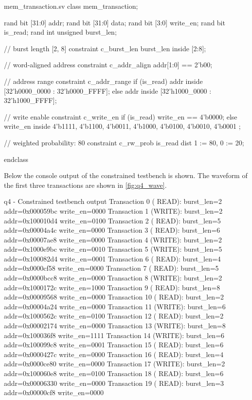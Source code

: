 \documentclass[../main.tex]{subfiles}
\begin{document}
\begin{svcode}{mem\_transaction.sv}
class mem_transaction;

  rand bit [31:0]   addr;
  rand bit [31:0]   data;
  rand bit [3:0]    write_en;
  rand bit          is_read;
  rand int unsigned burst_len;

  // burst length [2, 8]
  constraint c_burst_len {
    burst_len inside {[2:8]};
  }

  // word-aligned address
  constraint c_addr_align {
    addr[1:0] == 2'b00;
  }

  // address range
  constraint c_addr_range {
    if (is_read)
      addr inside {[32'h0000_0000 : 32'h0000_FFFF]};
    else
      addr inside {[32'h1000_0000 : 32'h1000_FFFF]};
  }

  // write enable
  constraint c_write_en {
    if (is_read)
      write_en == 4'b0000;
    else
      write_en inside {
        4'b1111, 4'b1100, 4'b0011, 4'b1000,
        4'b0100, 4'b0010, 4'b0001
      };
  }

  // weighted probability: 80%
  constraint c_rw_prob {
    is_read dist {1 := 80, 0 := 20};
  }

endclass
\end{svcode}

\newpage

Below the console output of the constrained testbench is shown. The waveform of the first three transactions are shown in \cref{fig:q4_wave}.

\begin{textcode}{q4 - Constrained testbench output}
Transaction 0 ( READ): burst_len=2 addr=0x000059bc write_en=0000
Transaction 1 (WRITE): burst_len=2 addr=0x100010d4 write_en=0100
Transaction 2 ( READ): burst_len=5 addr=0x00004a4c write_en=0000
Transaction 3 ( READ): burst_len=6 addr=0x00007ae8 write_en=0000
Transaction 4 (WRITE): burst_len=2 addr=0x1000e9bc write_en=0010
Transaction 5 (WRITE): burst_len=5 addr=0x100082d4 write_en=0001
Transaction 6 ( READ): burst_len=4 addr=0x0000cf58 write_en=0000
Transaction 7 ( READ): burst_len=5 addr=0x0000bcc8 write_en=0000
Transaction 8 (WRITE): burst_len=2 addr=0x1000172c write_en=1000
Transaction 9 ( READ): burst_len=8 addr=0x00009568 write_en=0000
Transaction 10 ( READ): burst_len=2 addr=0x00004a24 write_en=0000
Transaction 11 (WRITE): burst_len=6 addr=0x1000562c write_en=0100
Transaction 12 ( READ): burst_len=2 addr=0x00002174 write_en=0000
Transaction 13 (WRITE): burst_len=8 addr=0x100036f8 write_en=1111
Transaction 14 (WRITE): burst_len=6 addr=0x100099c8 write_en=0001
Transaction 15 ( READ): burst_len=6 addr=0x0000427c write_en=0000
Transaction 16 ( READ): burst_len=4 addr=0x0000ce80 write_en=0000
Transaction 17 (WRITE): burst_len=2 addr=0x100060e8 write_en=0100
Transaction 18 ( READ): burst_len=6 addr=0x00006330 write_en=0000
Transaction 19 ( READ): burst_len=3 addr=0x00000cf8 write_en=0000
\end{textcode}
\end{document}
